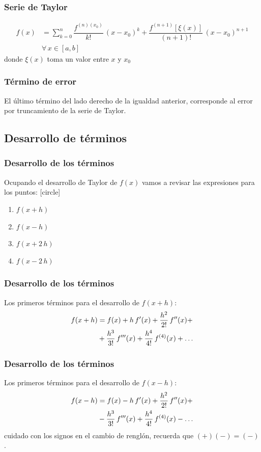 \begin{frame}
\frametitle{Serie de Taylor}
\begin{align*}
f(x) &= \sum_{k=0}^{n} \dfrac{f^{(n) (x_{0})}}{k!} \, (x - x_{0})^{k} + \dfrac{f^{(n+1)}[\xi (x)]}{(n+1)!} \, (x -x_{0})^{n+1} \\[1em]
&{} \forall \, x \in [a, b]
\end{align*}
donde $\xi(x)$ toma un valor entre $x$ y $x_{0}$
\end{frame}
\begin{frame}
\frametitle{Término de error}
El último término del lado derecho de la igualdad anterior, corresponde al error por truncamiento de la serie de Taylor.
\end{frame}
\subsection*{Desarrollo de términos}
\begin{frame}
\frametitle{Desarrollo de los términos}
Ocupando el desarrollo de Taylor de $f(x)$ vamos a revisar las expresiones para los puntos:
[circle]
\begin{enumerate}[<+->]
\item $f(x + h)$
\item $f(x - h)$
\item $f(x + 2 \, h)$
\item $f(x - 2 \, h)$
\end{enumerate}
\end{frame}
\begin{frame}
\frametitle{Desarrollo de los términos}
Los primeros términos para el desarrollo de $f(x + h)$:
\begin{align}
\begin{aligned}
f(x + h) &= f(x) + h \, {f}^{\prime} (x) + \dfrac{h^{2}}{2!} \, {f}^{\prime \prime} (x) + \\
&+ \dfrac{h^{3}}{3!} \, {f}^{\prime \prime \prime} (x) + \dfrac{h^{4}}{4!} \, {f}^{(4)} (x) + \ldots
\end{aligned}
\label{eq:ecuacion_diferencias_01}
\end{align}
\end{frame}
\begin{frame}
\frametitle{Desarrollo de los términos}
Los primeros términos para el desarrollo de $f(x - h)$:
\begin{align}
\begin{aligned}
f(x - h) &= f(x) - h \, {f}^{\prime} (x) + \dfrac{h^{2}}{2!} \, {f}^{\prime \prime} (x) + \\
&- \dfrac{h^{3}}{3!} \, {f}^{\prime \prime \prime} (x) + \dfrac{h^{4}}{4!} \, {f}^{(4)} (x) - \ldots
\end{aligned}
\label{eq:ecuacion_diferencias_02}
\end{align}
cuidado con los signos en el cambio de renglón, recuerda que $(+)(-) = (-)$.
\end{frame}
